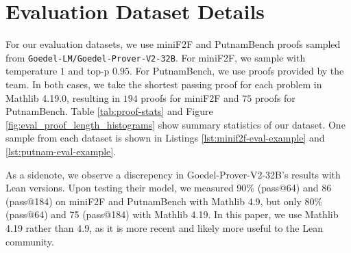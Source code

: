 \newpage
\section{Evaluation Dataset Details} \label{appendix:evaluation-dataset-details}

For our evaluation datasets, we use miniF2F and PutnamBench proofs sampled from \texttt{Goedel-LM/Goedel-Prover-V2-32B}. For miniF2F, we sample with temperature $1$ and top-p $0.95$. For PutnamBench, we use proofs provided by the team. In both cases, we take the shortest passing proof for each problem in Mathlib 4.19.0, resulting in $194$ proofs for miniF2F and $75$ proofs for PutnamBench. Table \ref{tab:proof-stats} and Figure \ref{fig:eval_proof_length_histograms} show summary statistics of our dataset. One sample from each dataset is shown in Listings \ref{lst:minif2f-eval-example} and \ref{lst:putnam-eval-example}.

As a sidenote, we observe a discrepency in Goedel-Prover-V2-32B's results with Lean versions. Upon testing their model, we measured 90\% (pass@64) and 86 (pass@184) on miniF2F and PutnamBench with Mathlib 4.9, but only 80\% (pass@64) and 75 (pass@184) with Mathlib 4.19. In this paper, we use Mathlib 4.19 rather than 4.9, as it is more recent and likely more useful to the Lean community.

